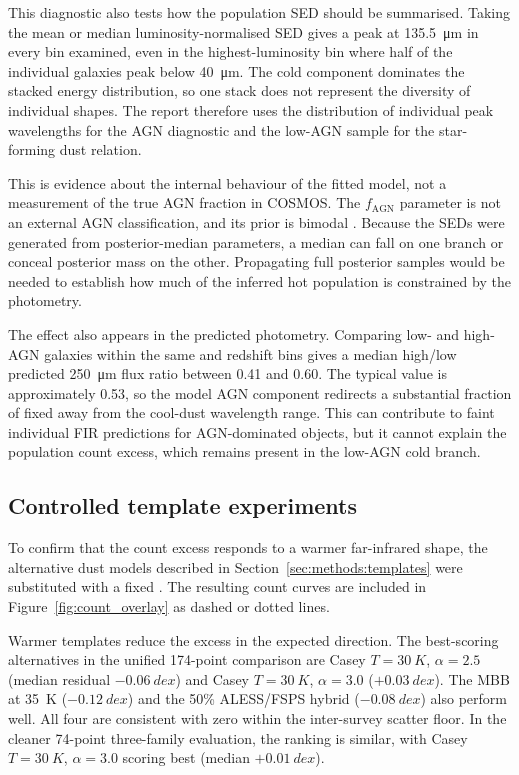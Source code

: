 \documentclass[12pt,a4paper]{article}
\begin{document}
This diagnostic also tests how the population SED should be summarised. Taking the mean
or median luminosity-normalised SED gives a peak at \SI{135.5}{\um} in every \LIR{} bin
examined,
even in the highest-luminosity bin where half of the individual galaxies peak below
\SI{40}{\um}. The cold component dominates the stacked energy distribution, so one
stack does not represent the diversity of individual shapes. The report therefore uses
the distribution of individual peak wavelengths for the AGN diagnostic and the low-AGN
sample for the star-forming dust relation.

This is evidence about the internal behaviour of the fitted model, not a measurement of
the true AGN fraction in COSMOS. The $f_\mathrm{AGN}$ parameter is not an external AGN
classification, and its prior is bimodal \citep{Thorp_2025_insights}. Because the SEDs
were generated from posterior-median parameters, a median can fall on one branch or
conceal posterior mass on the other. Propagating full posterior samples would be needed
to establish how much of the inferred hot population is constrained by the photometry.

The effect also appears in the predicted photometry. Comparing low- and high-AGN
galaxies within the same \LIR{} and redshift bins gives a median high/low predicted
\SI{250}{\um} flux ratio between 0.41 and 0.60. The typical value is approximately
0.53, so the model AGN component redirects a substantial fraction of fixed \LIR{} away
from the cool-dust wavelength range. This can contribute to faint individual FIR
predictions for AGN-dominated objects, but it cannot explain the population count
excess, which remains present in the low-AGN cold branch.

\subsection{Controlled template experiments}
\label{sec:results:templates}

To confirm that the count excess responds to a warmer far-infrared shape, the
alternative dust models described in Section~\ref{sec:methods:templates} were
substituted with a fixed \LIR{}. The resulting count curves are included in
Figure~\ref{fig:count_overlay} as dashed or dotted lines.

Warmer templates reduce the excess in the expected direction. The best-scoring
alternatives in the unified 174-point comparison are Casey $T = \SI{30}{K}$,
$\alpha = 2.5$ (median residual $-\SI{0.06}{dex}$) and Casey $T = \SI{30}{K}$,
$\alpha = 3.0$ ($+\SI{0.03}{dex}$). The MBB at \SI{35}{K} ($-\SI{0.12}{dex}$) and the
50\% ALESS/FSPS hybrid ($-\SI{0.08}{dex}$) also perform well. All four are consistent
with zero within the inter-survey scatter floor. In the cleaner 74-point three-family
evaluation, the ranking is similar, with Casey $T = \SI{30}{K}$, $\alpha = 3.0$ scoring
best (median $+\SI{0.01}{dex}$).
\end{document}
